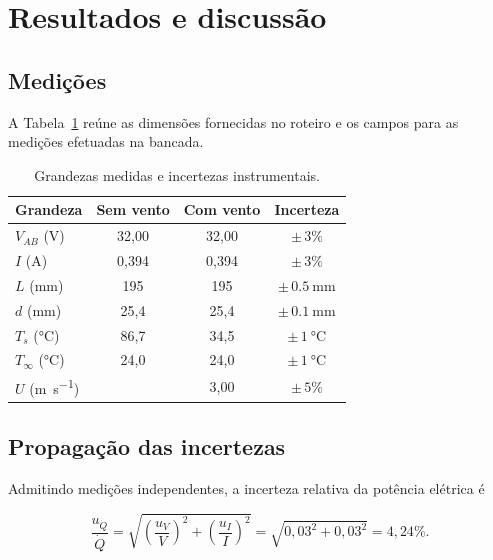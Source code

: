 \documentclass[11pt,a4paper]{article}
\newcommand{\Vsem}{32{,}00}
\newcommand{\Vcom}{32{,}00}
\newcommand{\Isem}{0{,}394}
\newcommand{\Icom}{0{,}394}
\newcommand{\Tssem}{86{,}7}
\newcommand{\Tscom}{34{,}5}
\newcommand{\Tinfsem}{24{,}0}
\newcommand{\Tinfcom}{24{,}0}
\newcommand{\velcom}{3{,}00}
\newcommand{\naoinformado}{\textemdash}
\begin{document}
\section{Resultados e discussão}

\subsection{Medições}

A Tabela~\ref{tab:medicoes} reúne as dimensões fornecidas no roteiro e os campos para as medições efetuadas na bancada.

\begin{table}[H]
  \centering
  \caption{Grandezas medidas e incertezas instrumentais.}
  \label{tab:medicoes}
  \small
  \begin{tabular}{lccc}
    \toprule
    \textbf{Grandeza} & \textbf{Sem vento} & \textbf{Com vento} & \textbf{Incerteza} \\
    \midrule
    $V_{AB}$ (\si{\volt}) & \Vsem & \Vcom & $\pm\,3\%$ \\
    $I$ (\si{\ampere}) & \Isem & \Icom & $\pm\,3\%$ \\
    $L$ (\si{\milli\metre}) & 195  & 195   & $\pm\,\SI{0.5}{\milli\metre}$ \\
    $d$ (\si{\milli\metre}) & 25,4 & 25,4 & $\pm\,\SI{0.1}{\milli\metre}$ \\
    $T_s$ (\si{\celsius}) & \Tssem & \Tscom & $\pm\,\SI{1}{\celsius}$ \\
    $T_\infty$ (\si{\celsius}) & \Tinfsem & \Tinfcom & $\pm\,\SI{1}{\celsius}$ \\
    $U$ (\si{\metre\per\second}) & \naoinformado & \velcom & $\pm\,5\%$ \\
    \bottomrule
  \end{tabular}
\end{table}

\subsection{Propagação das incertezas}

Admitindo medições independentes, a incerteza relativa da potência elétrica é

\begin{equation}
  \frac{u_{\dot Q}}{\dot Q}=
  \sqrt{\left(\frac{u_V}{V}\right)^2+
        \left(\frac{u_I}{I}\right)^2}
  =\sqrt{0{,}03^2+0{,}03^2}=4{,}24\%.
  \label{eq:uq}
\end{equation}
\end{document}

